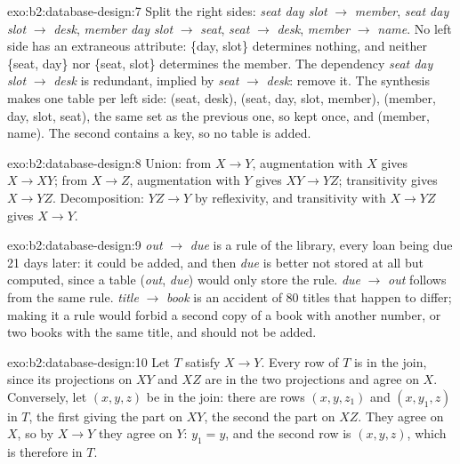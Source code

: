 \begin{solution}{exo:b2:database-design:7}
Split the right sides: \emph{seat day slot} $\to$ \emph{member}, \emph{seat day slot} $\to$ \emph{desk}, \emph{member
day slot} $\to$ \emph{seat}, \emph{seat} $\to$ \emph{desk}, \emph{member} $\to$ \emph{name}. No left side has an
extraneous attribute: \{day, slot\} determines nothing, and neither \{seat, day\} nor \{seat, slot\} determines the
member. The dependency \emph{seat day slot} $\to$ \emph{desk} is redundant, implied by \emph{seat} $\to$ \emph{desk}:
remove it. The synthesis makes one table per left side: (seat, desk), (seat, day, slot, member), (member, day, slot,
seat), the same set as the previous one, so kept once, and (member, name). The second contains a key, so no table is
added.

\end{solution}

\begin{solution}{exo:b2:database-design:8}
Union: from $X \to Y$, augmentation with $X$ gives $X \to XY$; from $X \to Z$, augmentation with $Y$ gives $XY \to YZ$;
transitivity gives $X \to YZ$. Decomposition: $YZ \to Y$ by reflexivity, and transitivity with $X \to YZ$ gives $X \to Y$.
\end{solution}

\begin{solution}{exo:b2:database-design:9}
\emph{out} $\to$ \emph{due} is a rule of the library, every loan being due 21 days later: it could be added, and then
\emph{due} is better not stored at all but computed, since a table (\emph{out}, \emph{due}) would only store the rule.
\emph{due} $\to$ \emph{out} follows from the same rule. \emph{title} $\to$ \emph{book} is an accident of 80 titles that
happen to differ; making it a rule would forbid a second copy of a book with another number, or two books with the same
title, and should not be added.
\end{solution}

\begin{solution}{exo:b2:database-design:10}
Let $T$ satisfy $X \to Y$. Every row of $T$ is in the join, since its projections on $XY$ and $XZ$ are in the two
projections and agree on $X$. Conversely, let $(x, y, z)$ be in the join: there are rows $(x, y, z_1)$ and $(x, y_1, z)$
in $T$, the first giving the part on $XY$, the second the part on $XZ$. They agree on $X$, so by $X \to Y$ they agree on
$Y$: $y_1 = y$, and the second row is $(x, y, z)$, which is therefore in $T$.
\end{solution}

